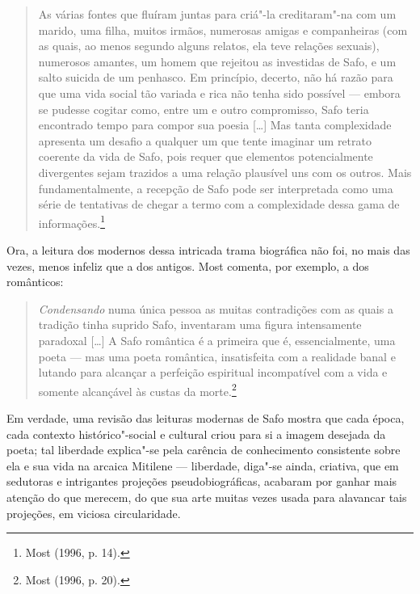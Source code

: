 \begin{quote}
As várias fontes que fluíram juntas para criá"-la creditaram"-na com um marido,
uma filha, muitos irmãos, numerosas amigas e companheiras (com as quais, ao
menos segundo alguns relatos, ela teve relações sexuais), numerosos amantes, um
homem que rejeitou as investidas de Safo, e um salto suicida de um penhasco. Em
princípio, decerto, não há razão para que uma vida social tão variada e rica
não tenha sido possível --- embora se pudesse cogitar como, entre um e outro
compromisso, Safo teria encontrado tempo para compor sua poesia [\ldots{}] Mas tanta
complexidade apresenta um desafio a qualquer um que tente imaginar um retrato
coerente da vida de Safo, pois requer que elementos potencialmente divergentes
sejam trazidos a uma relação plausível uns com os outros. Mais
fundamentalmente, a recepção de Safo pode ser interpretada como uma série de
tentativas de chegar a termo com a complexidade dessa gama de informações.\footnote{ Most (1996, p. 14).}
\end{quote}

Ora, a leitura dos modernos dessa intricada trama biográfica não foi, no mais
das vezes, menos infeliz que a dos antigos. Most comenta, por exemplo,
a dos românticos:

\begin{quote}
\textit{Condensando} numa única pessoa as muitas contradições com as quais a
tradição tinha suprido Safo, inventaram uma figura intensamente paradoxal
[\ldots{}] A Safo romântica é a primeira que é, essencialmente, uma poeta --- mas uma
poeta romântica, insatisfeita com a realidade banal e lutando para alcançar a
perfeição espiritual incompatível com a vida e somente alcançável às custas da
morte.\footnote{ Most (1996, p. 20).}
\end{quote}

Em verdade, uma revisão das leituras modernas de Safo mostra que cada época,
cada contexto histórico"-social e cultural criou para si a imagem desejada da
poeta; tal liberdade explica"-se pela carência de conhecimento consistente sobre
ela e sua vida na arcaica Mitilene --- liberdade, diga"-se ainda, criativa, que
em sedutoras e intrigantes projeções pseudobiográficas, acabaram por
ganhar mais atenção do que merecem, do que sua arte
muitas vezes usada para alavancar tais projeções, em viciosa circularidade. 

